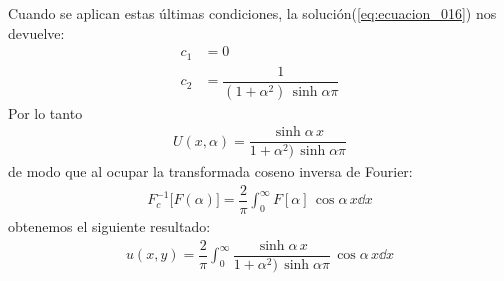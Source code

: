 Cuando se aplican estas últimas condiciones, la solución(\ref{eq:ecuacion_016}) nos devuelve:
\begin{align*}
c_{1} &= 0 \\[0.5em]
c_{2} &= \dfrac{1}{(1 + \alpha^{2}) \, \sinh \alpha \pi}
\end{align*}
Por lo tanto
\begin{align*}
U(x, \alpha) = \dfrac{\sinh \alpha \, x}{1 + \alpha^{2}) \, \sinh \alpha \pi}
\end{align*}
de modo que al ocupar la transformada coseno inversa de Fourier:
\begin{align*}
F_{c}^{-1} \big[F(\alpha)\big] = \dfrac{2}{\pi} \int_{0}^{\infty} F[\alpha] \, \cos \alpha \, x \dd{x}
\end{align*}
obtenemos el siguiente resultado:
\begin{align*}
u(x, y) = \dfrac{2}{\pi} \int_{0}^{\infty}  \dfrac{\sinh \alpha \, x}{1 + \alpha^{2}) \, \sinh \alpha \pi} \, \cos \alpha \, x \dd{x}
\end{align*}



